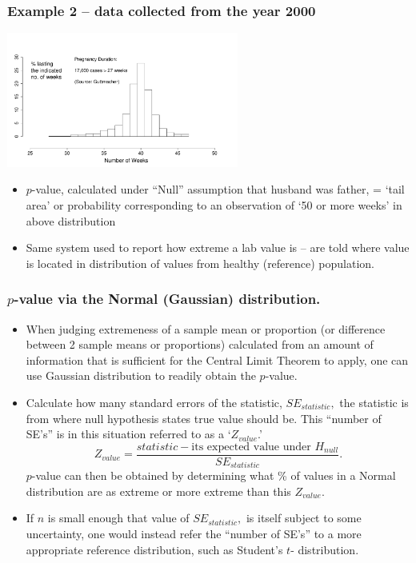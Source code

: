 \documentclass{beamer}\usepackage[]{graphicx}\usepackage[]{color}
\begin{document}
\begin{frame}
\frametitle{Example 2 -- data collected from the year 2000}

	\begin{center}
		\includegraphics[width=3in]{PregnancyDuration.pdf}
	\end{center}
	
	\begin{itemize}
		\setlength\itemsep{.3em}
		\item $p$-value, calculated under ``Null'' assumption 
	that husband was father,  =  `tail area' or probability corresponding  to an observation
	of `50 or more weeks' in  above distribution 
	
	\item Same system used to report how extreme a lab value is -- are told
	where value is located in distribution of values from  healthy (reference) population.
	\end{itemize} 
	

\end{frame}



\begin{frame}
\frametitle{$p$-value via the Normal (Gaussian) distribution.}

\begin{footnotesize}
\begin{itemize}
\item When judging extremeness of a sample mean or proportion (or  difference between 2 sample means or proportions) calculated from an amount of information that is sufficient for the Central Limit Theorem to apply, one can use Gaussian distribution to readily obtain the $p$-value.
\item Calculate how many standard errors of the statistic, $SE_{statistic},$ the statistic is from where null hypothesis states true value should be.  This ``number of SE's'' is in this situation referred to as a `$Z_{value}$.'
$$Z_{value} = \frac{statistic -  \textrm{its expected value under } H_{null} }{SE_{statistic}}.$$
$p$-value can then be obtained by determining what \% of values in a Normal distribution are as extreme or more extreme than this $Z_{value}.$
\item
If $n$ is small enough that value of $SE_{statistic},$ is itself subject to some 
uncertainty, one would instead refer the ``number of SE's'' to a more appropriate reference distribution, such as Student's $t$- distribution.
\end{itemize}

\end{footnotesize}
\end{frame}
\end{document}
